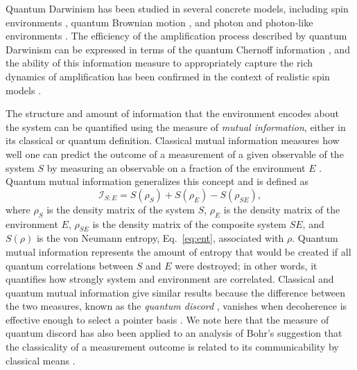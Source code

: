 \documentclass[3p,sort&compress]{elsarticle}
\newcommand{\op}[1]{#1}
\begin{document}
Quantum Darwinism has been studied in several concrete models, including spin environments \cite{Blume:2004:oo,Zwolak:2016:zz}, quantum Brownian motion \cite{Blume:2007:oo}, and photon and photon-like environments \cite{Riedel:2010:un,Riedel:2011:un,Zwolak:2014:tt}. The efficiency of the amplification process described by quantum Darwinism can be expressed in terms of the quantum Chernoff information \cite{Zwolak:2014:tt}, and the ability of this information measure to appropriately capture the rich dynamics of amplification has been confirmed in the context of realistic spin models \cite{Zwolak:2016:zz}. 

The structure and amount of information that the environment encodes about the system can be quantified using the measure of \emph{mutual information}, either in its classical \cite{Ollivier:2003:za,Ollivier:2004:im} or quantum \cite{Zurek:2002:ii,Blume:2004:oo,Blume:2005:oo} definition. Classical mutual information measures how well one can predict the outcome of a measurement of a given observable of the system $S$ by measuring an observable on a fraction of the environment $E$ \cite{Ollivier:2003:za,Ollivier:2004:im}. Quantum mutual information generalizes this concept and is defined as \cite{Zurek:2002:ii,Blume:2004:oo,Blume:2005:oo}
%
\begin{equation}
\mathcal{I}_{S:E} =S(\op{\rho}_S) + S(\op{\rho}_E) - S(\op{\rho}_{SE}),
\end{equation}
%
where $\op{\rho}_S$ is the density matrix of the system $S$, $\op{\rho}_E$ is the density matrix of the environment $E$, $\op{\rho}_{SE}$ is the density matrix of the composite system $SE$, and $S(\op{\rho})$ is the von Neumann entropy, Eq.~\eqref{eq:ent}, associated with $\op{\rho}$. Quantum mutual information represents the amount of entropy that would be created if all quantum correlations between $S$ and $E$ were destroyed; in other words, it quantifies how strongly system and environment are correlated. Classical and quantum mutual information give similar results \cite{Ollivier:2003:za,Ollivier:2004:im,Zurek:2002:ii,Blume:2004:oo,Blume:2005:oo} because the difference between the two measures, known as the \emph{quantum discord} \cite{Ollivier:2001:az}, vanishes when decoherence is effective enough to select a pointer basis \cite{Ollivier:2001:az}. We note here that the measure of quantum discord has also been applied to an analysis of Bohr's suggestion that the classicality of a measurement outcome is related to its communicability by classical means \cite{Streltsov:2013:oo}. 
\end{document}
